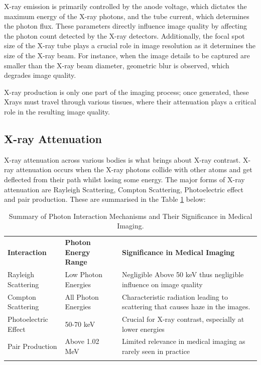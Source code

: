 X-ray emission is primarily controlled by the anode voltage, which dictates the maximum energy of the X-ray photons, and the tube current, which determines the photon flux. These parameters directly influence image quality by affecting the photon count detected by the X-ray detectors. Additionally, the focal spot size of the X-ray tube plays a crucial role in image resolution as it determines the size of the X-ray beam. For instance, when the image details to be captured are smaller than the X-ray beam diameter, geometric blur is observed, which degrades image quality.

X-ray production is only one part of the imaging process; once generated, these Xrays must travel through various tissues, where their attenuation plays a critical role in the resulting image quality.






\subsection{X-ray Attenuation}
\label{ch:LitReview:X-ray Attenuation}
X-ray attenuation across various bodies is what brings about X-ray contrast. X-ray attenuation occurs when the X-ray photons collide with other atoms and get deflected from their path whilst losing some energy. The major forms of X-ray attenuation are Rayleigh Scattering, Compton Scattering, Photoelectric effect and pair production. These are summarised in the Table  \ref{XrayAttenuation} below:

\begin{center}
\small
\setlength{\arrayrulewidth}{1mm} %
\setlength{\tabcolsep}{6pt} %
\renewcommand{\arraystretch}{1.5} %



\begin{longtable}{ p{}  p{}  p{} }

	\rowcolor[HTML]{D3D3D3}
	\textbf{Interaction} & \textbf{Photon Energy Range} & \textbf{Significance in Medical Imaging} \\
	\rowcolor[HTML]{FFFFFF} 
	Rayleigh Scattering & Low Photon Energies & Negligible Above 50 keV thus negligible influence on image quality \\
	\rowcolor[HTML]{F3F3F3} 
	Compton Scattering & All Photon Energies & Characteristic radiation leading to scattering that causes haze in the images. \\
	\rowcolor[HTML]{FFFFFF} 
	Photoelectric Effect & 50-70 keV & Crucial for X-ray contrast, especially at lower energies \\
	\rowcolor[HTML]{F3F3F3} 
	Pair Production & Above 1.02 MeV & Limited relevance in medical imaging as rarely seen in practice \\
	
	\caption{Summary of Photon Interaction Mechanisms and Their Significance in Medical Imaging.}
	\label{XrayAttenuation}

\end{longtable}
\end{center}

